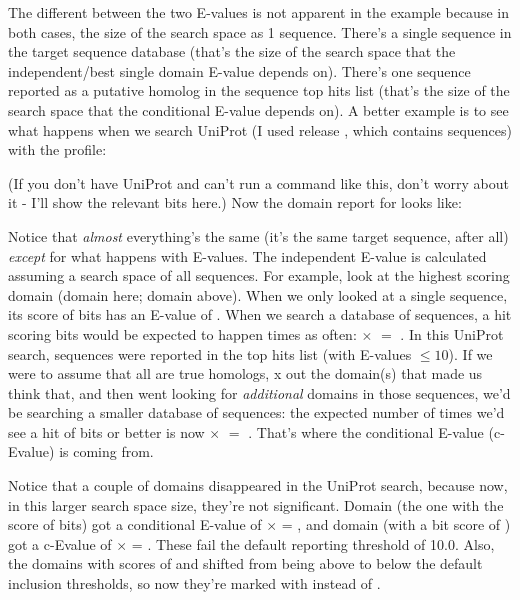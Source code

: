 The different between the two E-values is not apparent in the
 example because in both cases, the size of the
search space as 1 sequence. There's a single sequence in the target
sequence database (that's the size of the search space that the
independent/best single domain E-value depends on). There's one
sequence reported as a putative homolog in the sequence top hits list
(that's the size of the search space that the conditional E-value
depends on). A better example is to see what happens when we search
UniProt (I used release \UNIrelease{}, which contains \UNInseq{} sequences) 
with the  profile:

   \vspace{1ex}
   \vspace{1ex}

(If you don't have UniProt and can't run a command like this, don't
worry about it - I'll show the relevant bits here.) Now the domain
report for  looks like:


Notice that \emph{almost} everything's the same (it's the same target
sequence, after all) \emph{except} for what happens with E-values. The
independent E-value is calculated assuming a search space of all
\UNInseq{} sequences. For example, look at the highest scoring domain
(domain \SFSmaxdomu{} here; domain \SFSmaxdom{} above). When we only looked at a single
sequence, its score of \SFSmaxsc{} bits has an E-value of \SFSievalue{}. When we
search a database of \UNInseq{} sequences, a hit scoring \SFSmaxsc{} bits would
be expected to happen \UNInseq{} times as often: \SFSievalue{} $\times$ \UNInseq{}
$=$ \SFSuievalue{}. In this UniProt
search, \SFSdomZ{} sequences were reported in the top hits list (with
E-values $\leq 10$). If we were to assume that all \SFSdomZ{} are true
homologs, x out the domain(s) that made us think that, and then went
looking for \emph{additional} domains in those \SFSdomZ{} sequences, we'd be
searching a smaller database of \SFSdomZ{} sequences: the expected number of
times we'd see a hit of \SFSmaxsc{} bits or better is now \SFSievalue{} $\times$
\SFSdomZ{} $=$ \SFSucevalue. That's where the conditional E-value (c-Evalue) is
coming from.

Notice that a couple of domains disappeared in the UniProt search,
because now, in this larger search space size, they're not
significant. Domain \SFSaidx{} (the one with the score of \SFSascore{}
bits) got a conditional E-value of \SFSaevalue{} $\times$ \SFSdomZ{} =
\SFSauevalue{}, and domain \SFSbidx{} (with a bit score of
\SFSbscore{}) got a c-Evalue of \SFSbevalue{} $\times$ \SFSdomZ =
\SFSbuevalue{}. These fail the default reporting threshold of
10.0. Also, the domains with scores of \SFSainsig{} and \SFSbinsig{}
shifted from being above to below the default inclusion thresholds, so
now they're marked with  instead of \mono{!}.

